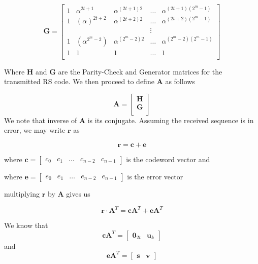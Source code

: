 \documentclass[fontsize=12pt]{article}
\begin{document}
\begin{equation}
\mathbf{G}=
\begin{bmatrix}
    1       &  \alpha^{2t+1}  &  \alpha^{(2t+1)2}  & \dots &  \alpha^{(2t+1)(2^m-1)}  \\
    1      &  ( \alpha )^{2t+2} &   \alpha^{(2t+2)2}  & \dots &  \alpha^{(2t+2)(2^m-1)}  \\
    &&&\vdots{} \\
    1       &  (\alpha^{2^m-2}) & \alpha^{(2^m-2)2}  & \dots &  \alpha^{(2^m-2)(2^m-1)}  \\
    1       & 1&  1 & \dots & 1  \\
\end{bmatrix}
\end{equation}


Where $\mathbf{H}$ and $\mathbf{G}$ are the Parity-Check and Generator matrices
for the transmitted RS code.
We then proceed to define $\mathbf{A}$ as follows

\begin{equation}
\mathbf{A}=
\begin{bmatrix}
    \mathbf{H}   \\
    \mathbf{G}       \\
\end{bmatrix}
\end{equation}
We note that inverse of $\mathbf{A}$ is its conjugate.
Assuming the received sequence is in error, we may write $\mathbf{r}$ as
 
 \begin{equation}
 \mathbf{r}=\mathbf{c}+\mathbf{e}
 \end{equation}
 
 where $\mathbf{c}=\begin{bmatrix}
    c_{0} & c_{1} & \dots{} & c_{n-2}& c_{n-1}   
\end{bmatrix}$ is the codeword vector and

where $\mathbf{e}=\begin{bmatrix}
    e_{0} & e_{1} & \dots{} & e_{n-2}& e_{n-1}   
\end{bmatrix}$ is the error vector 

multiplying $\mathbf{r}$ by $\mathbf{A}$ gives us

\begin{equation}
\mathbf{r} \cdot \mathbf{A}^T =\mathbf{c}\mathbf{A}^T+\mathbf{e}\mathbf{A}^T
\label{8}
\end{equation}

We know that $$\mathbf{c}\mathbf{A}^T=\begin{bmatrix} \mathbf{0}_{2t}& \mathbf{u}_k \end{bmatrix}$$
and 
$$\mathbf{e}\mathbf{A}^T=\begin{bmatrix} \mathbf{s}& \mathbf{v} \end{bmatrix}$$
\end{document}
